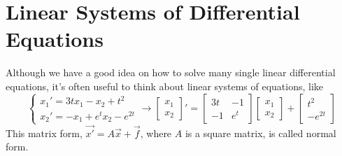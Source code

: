 \chapter{Linear Systems of Differential Equations}
Although we have a good idea on how to solve many single linear differential equations, it's often useful to think about linear systems of equations, like
\begin{equation*}
	\begin{cases}
		x_1' = 3tx_1 - x_2 + t^2 \\
		x_2' = -x_1 + e^tx_2 - e^{2t}
	\end{cases}
	\to
	\begin{bmatrix}
		x_1 \\ 
		x_2
	\end{bmatrix}' = \begin{bmatrix}
		3t & -1 \\
		-1 & e^t
	\end{bmatrix} \begin{bmatrix}
		x_1 \\
		x_2
	\end{bmatrix} + \begin{bmatrix}
		t^2 \\
		-e^{2t}
	\end{bmatrix}
\end{equation*}
This matrix form, $\vec{x'} = A\vec{x} + \vec{f}$, where $A$ is a square matrix, is called normal form.\\




